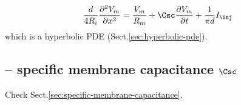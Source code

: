\begin{equation}
  \label{eq:cable-equation}
  \frac{d}{4R_i} \frac{\partial ^2V_m}{\partial x^2} = \frac{V_m}{R_m} + 
  \Csc \frac{\partial V_m}{\partial t} + \frac{1}{\pi d} I_\inj
\end{equation}
which is a hyperbolic PDE (Sect.\ref{sec:hyperbolic-pde}).

%   
%   


\subsection{-- specific membrane capacitance $\Csc$}

Check Sect.\ref{sec:specific-membrane-capacitance}.

